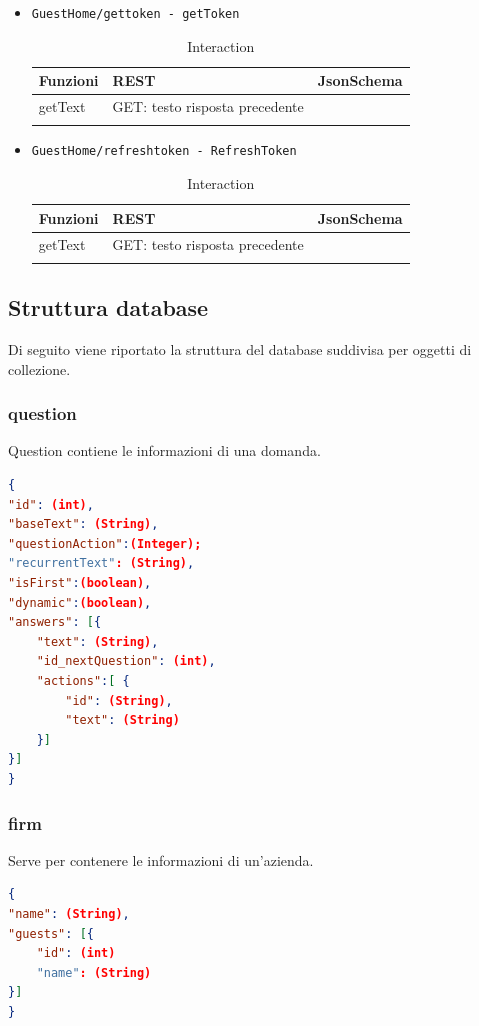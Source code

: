 \documentclass[../DefinizioneDiProdotto_v3.0.0.tex]{subfiles}
\begin{document}
\begin{itemize}
	\item \texttt{GuestHome/gettoken - getToken}
	      \begin{longtable}[c] { >{\centering\arraybackslash}p{3cm} >{\centering\arraybackslash}p{6cm} >{\centering\arraybackslash}p{3cm}}
	      	\toprule
	      	\centerline{\textbf{Funzioni}} & \centerline{\textbf{REST}}     & \centerline{\textbf{JsonSchema}} \\
	      	\midrule
	      	getText                        & GET: testo risposta precedente &                                  \\
	      	\bottomrule
	      	\caption{Interaction}
	      \end{longtable}
	\item \texttt{GuestHome/refreshtoken - RefreshToken}
	      \begin{longtable}[c] { >{\centering\arraybackslash}p{3cm} >{\centering\arraybackslash}p{6cm} >{\centering\arraybackslash}p{3cm}}
	      	\toprule
	      	\centerline{\textbf{Funzioni}} & \centerline{\textbf{REST}}     & \centerline{\textbf{JsonSchema}} \\
	      	\midrule
	      	getText                        & GET: testo risposta precedente &                                  \\
	      	\bottomrule
	      	\caption{Interaction}
	      \end{longtable}
\end{itemize}


\subsection{Struttura database}
Di seguito viene riportato la struttura del database suddivisa per oggetti di collezione.
\subsubsection{question}
Question contiene le informazioni di una domanda.
\begin{lstlisting}[language=json,firstnumber=1]
{
"id": (int),
"baseText": (String),
"questionAction":(Integer);
"recurrentText": (String),
"isFirst":(boolean),
"dynamic":(boolean),
"answers": [{
	"text": (String),
	"id_nextQuestion": (int),
	"actions":[ {
		"id": (String),
		"text": (String)
	}]
}]
}
\end{lstlisting}

\subsubsection{firm}
Serve per contenere le informazioni di un'azienda.
\begin{lstlisting}[language=json,firstnumber=1]
{
"name": (String),
"guests": [{
	"id": (int)
	"name": (String)
}]
}
\end{lstlisting}
\end{document}
